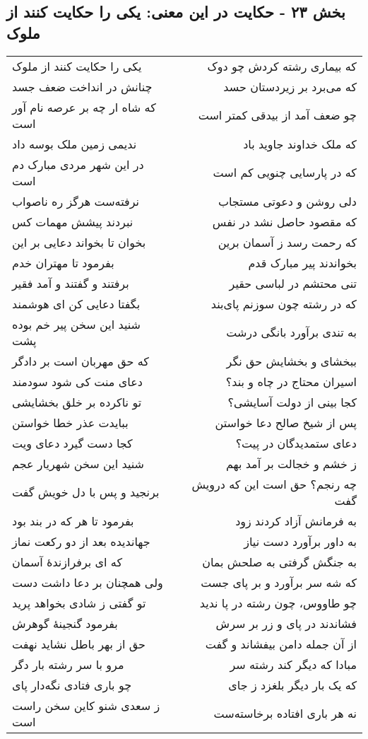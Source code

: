 \begin{center}
\section*{بخش ۲۳ - حکایت در این معنی: یکی را حکایت کنند از ملوک}
\label{sec:023}
\begin{longtable}{l p{0.5cm} r}
یکی را حکایت کنند از ملوک
&&
که بیماری رشته کردش چو دوک
\\
چنانش در انداخت ضعف جسد
&&
که می‌برد بر زیردستان حسد
\\
که شاه ار چه بر عرصه نام آور است
&&
چو ضعف آمد از بیدقی کمتر است
\\
ندیمی زمین ملک بوسه داد
&&
که ملک خداوند جاوید باد
\\
در این شهر مردی مبارک دم است
&&
که در پارسایی چنویی کم است
\\
نرفته‌ست هرگز ره ناصواب
&&
دلی روشن و دعوتی مستجاب
\\
نبردند پیشش مهمات کس
&&
که مقصود حاصل نشد در نفس
\\
بخوان تا بخواند دعایی بر این
&&
که رحمت رسد ز آسمان برین
\\
بفرمود تا مهتران خدم
&&
بخواندند پیر مبارک قدم
\\
برفتند و گفتند و آمد فقیر
&&
تنی محتشم در لباسی حقیر
\\
بگفتا دعایی کن ای هوشمند
&&
که در رشته چون سوزنم پای‌بند
\\
شنید این سخن پیر خم بوده پشت
&&
به تندی برآورد بانگی درشت
\\
که حق مهربان است بر دادگر
&&
ببخشای و بخشایش حق نگر
\\
دعای منت کی شود سودمند
&&
اسیران محتاج در چاه و بند؟
\\
تو ناکرده بر خلق بخشایشی
&&
کجا بینی از دولت آسایشی؟
\\
ببایدت عذر خطا خواستن
&&
پس از شیخ صالح دعا خواستن
\\
کجا دست گیرد دعای ویت
&&
دعای ستمدیدگان در پیت؟
\\
شنید این سخن شهریار عجم
&&
ز خشم و خجالت بر آمد بهم
\\
برنجید و پس با دل خویش گفت
&&
چه رنجم؟ حق است این که درویش گفت
\\
بفرمود تا هر که در بند بود
&&
به فرمانش آزاد کردند زود
\\
جهاندیده بعد از دو رکعت نماز
&&
به داور برآورد دست نیاز
\\
که ای برفرازندهٔ آسمان
&&
به جنگش گرفتی به صلحش بمان
\\
ولی همچنان بر دعا داشت دست
&&
که شه سر برآورد و بر پای جست
\\
تو گفتی ز شادی بخواهد پرید
&&
چو طاووس، چون رشته در پا ندید
\\
بفرمود گنجینهٔ گوهرش
&&
فشاندند در پای و زر بر سرش
\\
حق از بهر باطل نشاید نهفت
&&
از آن جمله دامن بیفشاند و گفت
\\
مرو با سر رشته بار دگر
&&
مبادا که دیگر کند رشته سر
\\
چو باری فتادی نگه‌دار پای
&&
که یک بار دیگر بلغزد ز جای
\\
ز سعدی شنو کاین سخن راست است
&&
نه هر باری افتاده برخاسته‌ست
\\
\end{longtable}
\end{center}
